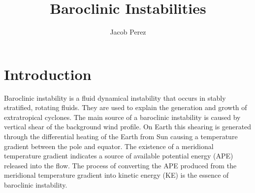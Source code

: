 \documentclass[a4paper,12pt]{article}
\title{Baroclinic Instabilities}
\author{Jacob Perez}
\begin{document}
 
\maketitle
\tableofcontents 
\section{Introduction} 
Baroclinic instability is a fluid dynamical instability that occurs in stably stratified, rotating fluids. They are used to explain the generation and growth of extratropical cyclones. The main source of a baroclinic instability is caused by vertical shear of the background wind profile. On Earth this shearing is generated through the differential heating of the Earth from Sun causing a temperature gradient between the pole and equator. The existence of a meridional temperature gradient indicates a source of available potential energy (APE) released into the flow. The process of converting the APE produced from the meridional temperature gradient into kinetic energy (KE) is the essence of baroclinic instability.  
\end{document}
